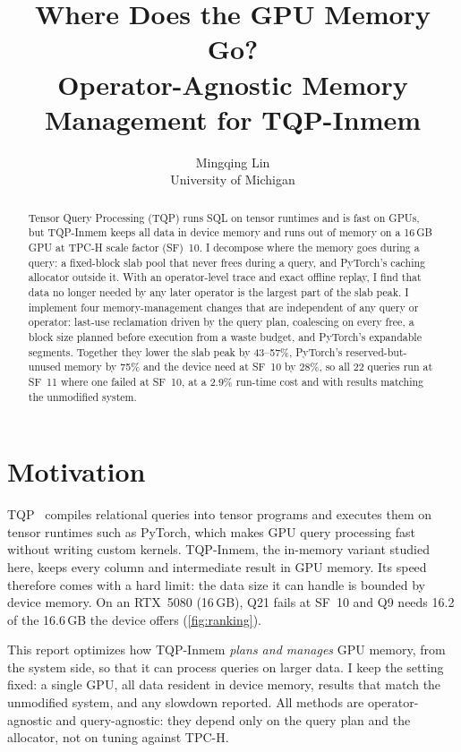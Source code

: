 \documentclass[10pt,twocolumn,letterpaper]{article}
\title{\Large\bfseries Where Does the GPU Memory Go?\\ Operator-Agnostic Memory Management for TQP-Inmem}
\author{Mingqing Lin\\ University of Michigan}
\date{}
\begin{document}
\maketitle

\begin{abstract}
Tensor Query Processing (TQP) runs SQL on tensor runtimes and is fast on GPUs, but
TQP-Inmem keeps all data in device memory and runs out of memory on a 16\,GB GPU
at TPC-H scale factor (SF)~10. I decompose where the memory goes during a query:
a fixed-block slab pool that never frees during a query, and PyTorch's caching
allocator outside it. With an operator-level trace and exact offline replay, I
find that data no longer needed by any later operator is the largest part of the
slab peak. I implement four memory-management changes that are independent of
any query or operator: last-use reclamation driven by the query plan, coalescing
on every free, a block size planned before execution from a waste budget, and
PyTorch's expandable segments. Together they lower the slab peak by 43--57\%,
PyTorch's reserved-but-unused memory by 75\% and the device need at SF~10 by 28\%, so
all 22 queries run at SF~11 where one failed at SF~10, at a 2.9\% run-time cost and with
results matching the unmodified system.
\end{abstract}

\section{Motivation}
\label{sec:motivation}
TQP~\cite{he2022tqp,cui2026tqppp} compiles relational queries into tensor programs
and executes them on tensor runtimes such as PyTorch, which makes GPU query processing
fast without writing custom kernels. TQP-Inmem, the in-memory variant studied here,
keeps every column and intermediate result in GPU memory. Its speed therefore comes with
a hard limit: the data size it can handle is bounded by device memory.
On an RTX~5080 (16\,GB), Q21 fails at SF~10 and Q9 needs 16.2 of the 16.6\,GB the device
offers (\cref{fig:ranking}).

This report optimizes how TQP-Inmem \emph{plans and manages} GPU memory, from the
system side, so that it can process queries on larger data. I keep the setting fixed:
a single GPU, all data resident in device memory, results that match the unmodified
system, and any slowdown reported. All methods are operator-agnostic and query-agnostic:
they depend only on the query plan and the allocator, not on tuning against TPC-H.
\end{document}
